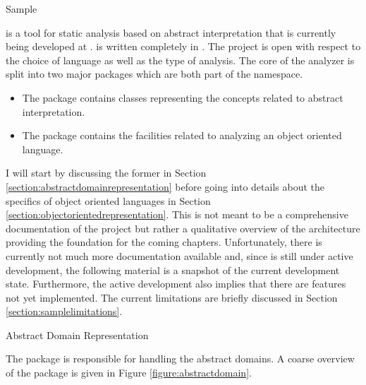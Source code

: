 %

\begin{chapter}{Sample}
	\label{chapter:Sample}

	\sample is a tool for static analysis based on abstract interpretation that is currently being developed at \ethz. \sample is written completely in \scala. The project is open with respect to the choice of language as well as the type of analysis. The core of the \sample analyzer is split into two major packages which are both part of the  namespace. 

	\begin{itemize}
		\item The  package contains classes representing the concepts related to abstract interpretation.
		\item The package  contains the facilities related to analyzing an object oriented language.
	\end{itemize}

	I will start by discussing the former in Section \ref{section:abstractdomainrepresentation} before going into details about the specifics of object oriented languages in Section \ref{section:objectorientedrepresentation}. This is not meant to be a comprehensive documentation of the \sample project but rather a qualitative overview of the architecture providing the foundation for the coming chapters. Unfortunately, there is currently not much more documentation available and, since \sample is still under active development, the following material is a snapshot of the current development state. Furthermore, the active development also implies that there are features not yet implemented. The current limitations are briefly discussed in Section \ref{section:samplelimitations}.


	\begin{section}{Abstract Domain Representation}
		\label{section:abstractdomainrepresentation}

		The  package is responsible for handling the abstract domains. A coarse overview of the package is given in Figure \ref{figure:abstractdomain}.
		

\end{section}
\end{chapter}
